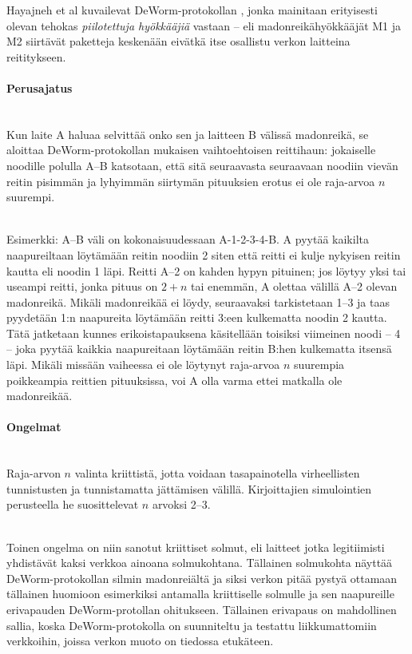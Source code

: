 \documentclass[finnish]{tktltiki2}
\theoremstyle{definition}
\theoremstyle{remark}
\begin{document}
Hayajneh et al kuvailevat DeWorm-protokollan \cite{deworm}, jonka mainitaan erityisesti olevan tehokas \emph{piilotettuja hyökkääjiä} vastaan -- eli madonreikähyökkääjät M1 ja M2 siirtävät paketteja keskenään eivätkä itse osallistu verkon laitteina reititykseen.

\paragraph{Perusajatus}
\noindent \\
Kun laite A haluaa selvittää onko sen ja laitteen B välissä madonreikä, se aloittaa DeWorm-protokollan mukaisen vaihtoehtoisen reittihaun: jokaiselle noodille polulla A--B katsotaan, että sitä seuraavasta seuraavaan noodiin vievän reitin pisimmän ja lyhyimmän siirtymän pituuksien erotus ei ole raja-arvoa $n$ suurempi. 

\noindent \\
Esimerkki: A--B väli on kokonaisuudessaan A-1-2-3-4-B. A pyytää kaikilta naapureiltaan löytämään reitin noodiin 2 siten että reitti ei kulje nykyisen reitin kautta eli noodin 1 läpi. Reitti A--2 on kahden hypyn pituinen; jos löytyy yksi tai useampi reitti, jonka pituus on $2 + n$ tai enemmän, A olettaa välillä A--2 olevan madonreikä. Mikäli madonreikää ei löydy, seuraavaksi tarkistetaan 1--3 ja taas pyydetään 1:n naapureita löytämään reitti 3:een kulkematta noodin 2 kautta. Tätä jatketaan kunnes erikoistapauksena käsitellään toisiksi viimeinen noodi -- 4 -- joka pyytää kaikkia naapureitaan löytämään reitin B:hen kulkematta itsensä läpi. Mikäli missään vaiheessa ei ole löytynyt raja-arvoa $n$ suurempia poikkeampia reittien pituuksissa, voi A olla varma ettei matkalla ole madonreikää.

\paragraph{Ongelmat}
\noindent \\
Raja-arvon $n$ valinta kriittistä, jotta voidaan tasapainotella virheellisten tunnistusten ja tunnistamatta jättämisen välillä. Kirjoittajien simulointien perusteella he suosittelevat $n$ arvoksi 2--3.

\noindent \\
Toinen ongelma on niin sanotut kriittiset solmut, eli laitteet jotka legitiimisti yhdistävät kaksi verkkoa ainoana solmukohtana. Tällainen solmukohta näyttää DeWorm-protokollan silmin madonreiältä ja siksi verkon pitää pystyä ottamaan tällainen huomioon esimerkiksi antamalla kriittiselle solmulle ja sen naapureille erivapauden DeWorm-protollan ohitukseen. Tällainen erivapaus on mahdollinen sallia, koska DeWorm-protokolla on suunniteltu ja testattu liikkumattomiin verkkoihin, joissa verkon muoto on tiedossa etukäteen.
\end{document}
